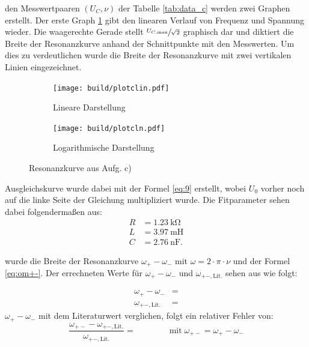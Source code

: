   \justifying den Messwertpaaren $(U_C, \nu)$ der Tabelle \ref{tab:data_c} werden zwei Graphen erstellt. Der erste Graph \ref{fig:5clin} 
  gibt den linearen Verlauf von Frequenz und Spannung wieder. Die waagerechte Gerade stellt $\sfrac{U_{C,\text{max}}}{\sqrt{2}}$ graphisch dar und diktiert
  die Breite der Resonanzkurve anhand der Schnittpunkte mit den Messwerten. Um dies zu verdeutlichen wurde die Breite der Resonanzkurve mit zwei vertikalen 
  Linien eingezeichnet. 


  \begin{figure}[H]
    \begin{subfigure}{0.495\linewidth}
     \texttt{[image: build/plotclin.pdf]}
     \centering
     \caption{Lineare Darstellung}
     \label{fig:5clin}
    \end{subfigure}
    \begin{subfigure}{0.495\linewidth}
     \texttt{[image: build/plotcln.pdf]}
     \centering
     \caption{Logarithmische Darstellung}
     \label{fig:5cln}
    \end{subfigure}
    \caption{Resonanzkurve aus Aufg. c)}
  \end{figure} 

  \justifying Ausgleichskurve wurde dabei mit der Formel \eqref{eq:9} erstellt,
  wobei $U_0$ vorher noch auf die linke Seite der Gleichung multipliziert wurde.
  Die Fitparameter sehen dabei folgendermaßen aus:
  \begin{align}
    R &= \SI{1.23}{\kilo\ohm}\\
    L &= \SI{3.97}{\milli\henry}\\
    C &= \SI{2.76}{\nano\farad}.
  \end{align}

  \justifying wurde die Breite der Resonanzkurve $\omega_+ - \omega_-$ mit $\omega = 2\cdot\pi\cdot\nu$ 
  und der Formel \eqref{eq:om+-}. Der errechneten Werte für $\omega_+ - \omega_-$ und $\omega_{+-,\text{Lit.}}$ sehen aus wie folgt:
   
  \begin{align}
  \omega_+ - \omega_- &= \text{}\\
  \omega_{+-,\text{Lit.}} &= \text{} \label{eq:29}
  \end{align}
  \justifying $\omega_+ - \omega_-$ mit dem Literaturwert verglichen, folgt ein relativer Fehler von:
  \begin{equation}
  \frac{\omega_{+-} - \omega_{+-,\text{Lit.}}}{\omega_{+-,\text{Lit.}}} = \text{} \qquad \qquad \text{mit} \; \omega_{+-} = \omega_+ - \omega_-
  \end{equation}

